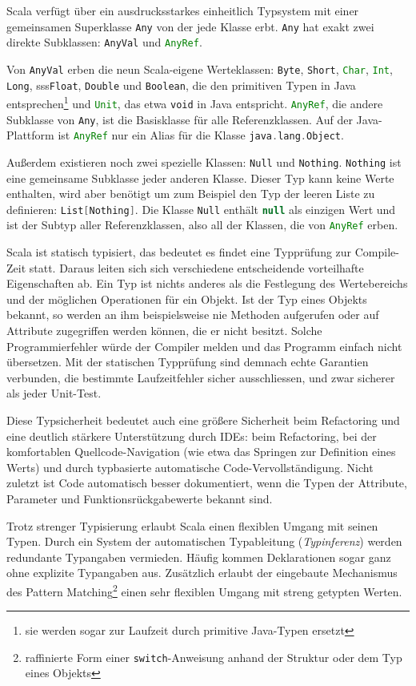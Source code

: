 \documentclass[a4paper, 12pt, hidelinks, listof=totoc, listoftables=totoc, bibliography=totoc]{scrreprt}
\newcommand{\code}[1]{\lstinline[language=Scala, style=inline]|#1|}
\newcommand{\scala}[1]{\lstinline[language=Scala, style=inline]|#1|}
\begin{document}
Scala verfügt über ein ausdrucksstarkes einheitlich Typsystem mit einer gemeinsamen Superklasse \scala{Any} von der jede Klasse erbt. \scala{Any} hat exakt zwei direkte Subklassen: \scala{AnyVal} und \scala{AnyRef}. 

Von \scala{AnyVal} erben die neun Scala-eigene Werteklassen: \scala{Byte}, \scala{Short}, \scala{Char}, \scala{Int}, \scala{Long}, \mbox{sss\scala{Float},} \scala{Double} und \scala{Boolean}, die den primitiven Typen in Java entsprechen\footnote{sie werden sogar zur Laufzeit durch primitive Java-Typen ersetzt} und \scala{Unit}, das etwa \scala{void} in Java entspricht. \scala{AnyRef}, die andere Subklasse von \scala{Any}, ist die Basisklasse für alle Referenzklassen. Auf der Java-Plattform ist \scala{AnyRef} nur ein Alias für die Klasse \mbox{\scala{java.lang.Object}}.

Außerdem existieren noch zwei spezielle Klassen: \scala{Null} und \scala{Nothing}. \scala{Nothing} ist eine gemeinsame Subklasse jeder anderen Klasse. Dieser Typ kann keine Werte enthalten, wird aber benötigt um zum Beispiel den Typ der leeren Liste zu definieren: \mbox{\scala{List[Nothing]}}. Die Klasse \scala{Null} enthält \scala{null} als einzigen Wert und ist der Subtyp aller Referenzklassen, also all der Klassen, die von \scala{AnyRef} erben.

Scala ist statisch typisiert, das bedeutet es findet eine Typprüfung zur Compile-Zeit statt. Daraus leiten sich sich verschiedene entscheidende vorteilhafte Eigenschaften ab. Ein Typ ist nichts anderes als die Festlegung des Wertebereichs und der möglichen Operationen für ein Objekt. Ist der Typ eines Objekts bekannt, so werden an ihm beispielsweise nie Methoden aufgerufen oder auf Attribute zugegriffen werden können, die er nicht besitzt. Solche Programmierfehler würde der Compiler melden und das Programm einfach nicht übersetzen. Mit der statischen Typprüfung sind demnach echte Garantien verbunden, die bestimmte Laufzeitfehler sicher ausschliessen, und zwar sicherer als jeder Unit-Test.

Diese Typsicherheit bedeutet auch eine größere Sicherheit beim Refactoring und eine deutlich stärkere Unterstützung durch IDEs: beim Refactoring, bei der komfortablen Quellcode-Navigation (wie etwa das Springen zur Definition eines Werts) und durch typbasierte automatische Code-Vervollständigung. Nicht zuletzt ist Code automatisch besser dokumentiert, wenn die Typen der Attribute, Parameter und Funktionsrückgabewerte bekannt sind.

Trotz strenger Typisierung erlaubt Scala einen flexiblen Umgang mit seinen Typen. Durch ein System der automatischen Typableitung (\emph{Typinferenz}) werden redundante Typangaben vermieden. Häufig kommen Deklarationen sogar ganz ohne explizite Typangaben aus. Zusätzlich erlaubt der eingebaute Mechanismus des Pattern Matching\footnote{raffinierte Form einer \code{switch}-Anweisung anhand der Struktur oder dem Typ eines Objekts} einen sehr flexiblen Umgang mit streng getypten Werten.
\end{document}
